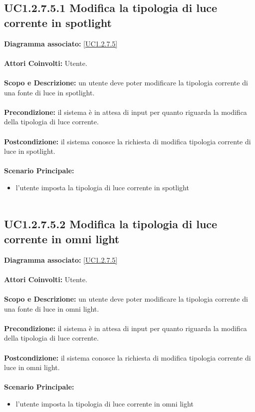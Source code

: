 \subsection{UC1.2.7.5.1 Modifica la tipologia di luce corrente in spotlight}
\textbf{Diagramma associato:}
\ref{UC1.2.7.5} \\ \\
\textbf{Attori Coinvolti:}
Utente. \\ \\
\textbf{Scopo e Descrizione:}
un utente deve poter modificare la tipologia corrente di una fonte di luce in spotlight. \\ \\
\textbf{Precondizione:}
il sistema è in attesa di input per quanto riguarda la modifica della tipologia di luce corrente. \\ \\
\textbf{Postcondizione:}
il sistema conosce la richiesta di modifica tipologia corrente di luce in spotlight. \\ \\
\textbf{Scenario Principale:}
\begin{itemize}
\item l'utente imposta la tipologia di luce corrente in spotlight
\\ \\ \end{itemize}


\subsection{UC1.2.7.5.2 Modifica la tipologia di luce corrente in omni light}
\textbf{Diagramma associato:}
\ref{UC1.2.7.5} \\ \\
\textbf{Attori Coinvolti:}
Utente. \\ \\
\textbf{Scopo e Descrizione:}
un utente deve poter modificare la tipologia corrente di una fonte di luce in omni light. \\ \\
\textbf{Precondizione:}
il sistema è in attesa di input per quanto riguarda la modifica della tipologia di luce corrente. \\ \\
\textbf{Postcondizione:}
il sistema conosce la richiesta di modifica tipologia corrente di luce in omni light. \\ \\
\textbf{Scenario Principale:}
\begin{itemize}
\item l'utente imposta la tipologia di luce corrente in omni light
\\ \\ \end{itemize}


